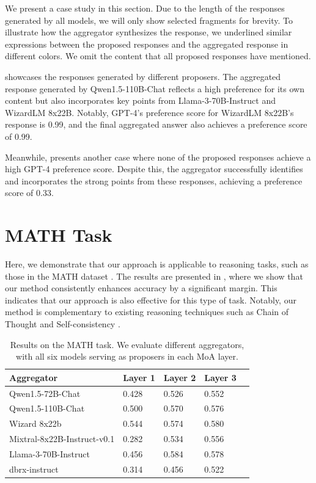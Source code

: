 \documentclass{article}
\begin{document}
We present a case study in this section. 
Due to the length of the responses generated by all models, we will only show selected fragments for brevity. 
To illustrate how the aggregator synthesizes the response, 
we underlined similar expressions between the proposed responses and the aggregated response in different colors.
We omit the content that all proposed responses have mentioned.

 showcases the responses generated by different proposers.
The aggregated response generated by Qwen1.5-110B-Chat 
reflects a high preference for its own content but also incorporates key points 
from Llama-3-70B-Instruct and WizardLM 8x22B. 
Notably, GPT-4's preference score for WizardLM 8x22B's response is 0.99, 
and the final aggregated answer also achieves a preference score of 0.99.

Meanwhile,  presents another case
where none of the proposed responses achieve a high GPT-4 preference score. 
Despite this, the aggregator successfully identifies and 
incorporates the strong points from these responses,
achieving a preference score of 0.33.


\section{MATH Task}

Here, we demonstrate that our approach is applicable to reasoning tasks, 
such as those in the MATH dataset \cite{hendrycks2021measuring}.
The results are presented in , where we show that our method consistently enhances accuracy by a significant margin. 
This indicates that our approach is also effective for this type of task.
Notably, our method is complementary to existing reasoning techniques such as Chain of Thought \cite{cot} and Self-consistency \cite{cot-sc}.

\begin{table}[t]
\centering
\caption{
Results on the MATH task. 
We evaluate different aggregators,
with all six models serving as proposers in each MoA layer.
}
\begin{tabular}{@{}lllll@{}}
\toprule
Aggregator                  & Layer 1 & Layer 2 & Layer 3  \\
\midrule
Qwen1.5-72B-Chat            & 0.428              & 0.526   & 0.552    \\
Qwen1.5-110B-Chat           & 0.500              & 0.570   & 0.576    \\
Wizard 8x22b                & 0.544              & 0.574   & 0.580    \\
Mixtral-8x22B-Instruct-v0.1 & 0.282              & 0.534   & 0.556    \\
Llama-3-70B-Instruct        & 0.456              & 0.584   & 0.578    \\
dbrx-instruct               & 0.314              & 0.456   & 0.522    \\
\bottomrule
\end{tabular}
\label{tab:MATH}
\end{table}
\end{document}
